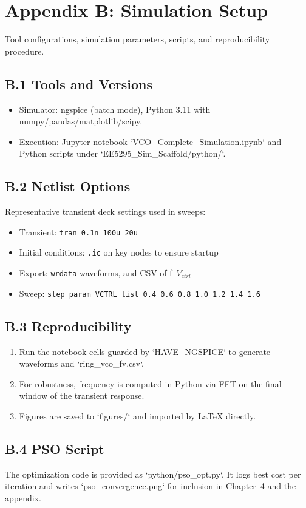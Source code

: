 \chapter{Appendix B: Simulation Setup}
Tool configurations, simulation parameters, scripts, and reproducibility procedure.

\section*{B.1 Tools and Versions}
\begin{itemize}
  \item Simulator: ngspice (batch mode), Python 3.11 with numpy/pandas/matplotlib/scipy.
  \item Execution: Jupyter notebook `VCO_Complete_Simulation.ipynb` and Python scripts under `EE5295_Sim_Scaffold/python/`.
\end{itemize}

\section*{B.2 Netlist Options}
Representative transient deck settings used in sweeps:
\begin{itemize}
  \item Transient: \texttt{tran 0.1n 100u 20u}
  \item Initial conditions: \texttt{.ic} on key nodes to ensure startup
  \item Export: \texttt{wrdata} waveforms, and CSV of f--\(V_{ctrl}\)
  \item Sweep: \texttt{step param VCTRL list 0.4 0.6 0.8 1.0 1.2 1.4 1.6}
\end{itemize}

\section*{B.3 Reproducibility}
\begin{enumerate}
  \item Run the notebook cells guarded by `HAVE_NGSPICE` to generate waveforms and `ring_vco_fv.csv`.
  \item For robustness, frequency is computed in Python via FFT on the final window of the transient response.
  \item Figures are saved to `figures/` and imported by LaTeX directly.
\end{enumerate}

\section*{B.4 PSO Script}
The optimization code is provided as `python/pso_opt.py`. It logs best cost per iteration and writes `pso_convergence.png` for inclusion in Chapter~4 and the appendix.

